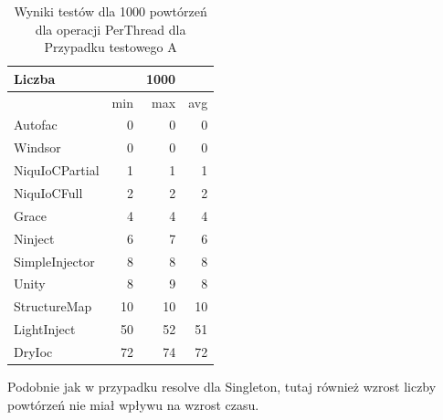 \documentclass[12pt]{article}
\begin{document}
\begin{table}[H]
\captionsetup{belowskip=0pt,aboveskip=0pt}
\begin{center}
\begin{small}
	\begin{tabular}{ | l | r r r | }
    		\hline
Liczba & & 1000 & \\ \hline
 & min & max & avg \\ \hline
Autofac & 0 & 0 & 0 \\ \hline
Windsor & 0 & 0 & 0 \\ \hline
NiquIoCPartial & 1 & 1 & 1 \\ \hline
NiquIoCFull & 2 & 2 & 2 \\ \hline
Grace & 4 & 4 & 4 \\ \hline
Ninject & 6 & 7 & 6 \\ \hline
SimpleInjector & 8 & 8 & 8 \\ \hline
Unity & 8 & 9 & 8 \\ \hline
StructureMap & 10 & 10 & 10 \\ \hline
LightInject & 50 & 52 & 51 \\ \hline
DryIoc & 72 & 74 & 72 \\ \hline
  	\end{tabular}
\end{small}
\end{center}
\caption{Wyniki testów dla 1000 powtórzeń dla operacji PerThread dla Przypadku testowego A}
\label{TestCaseA_PerThread1000}
\end{table}
Podobnie jak w przypadku resolve dla Singleton, tutaj również wzrost liczby powtórzeń nie miał wpływu na wzrost czasu.
\end{document}
